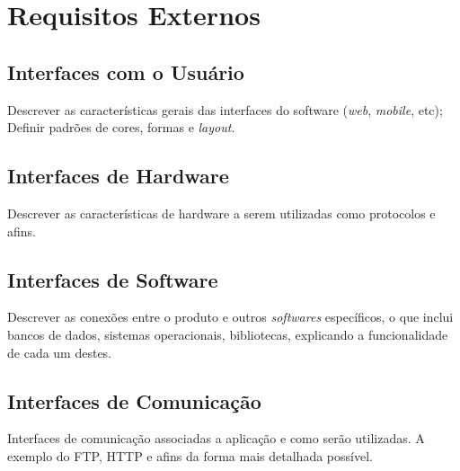 \chapter{Requisitos Externos}

\section{Interfaces com o Usuário}

Descrever as características gerais das interfaces do software (\textit{web}, \textit{mobile}, etc); Definir padrões de cores, formas e \textit{layout}.

\section{Interfaces de Hardware}

Descrever as características de hardware a serem utilizadas como protocolos e afins.

\section{Interfaces de Software}

Descrever as conexões entre o produto e outros \textit{softwares} específicos, o que inclui bancos de dados, sistemas operacionais, bibliotecas, explicando a funcionalidade de cada um destes.

\section{Interfaces de Comunicação}

Interfaces de comunicação associadas a aplicação e como serão utilizadas. A exemplo do FTP, HTTP e afins da forma mais detalhada possível.